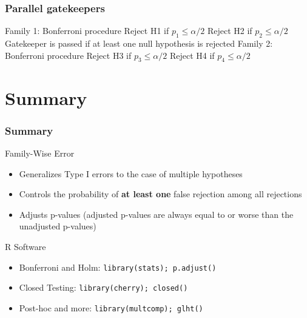 \documentclass[xcolor={pdftex,dvipsnames,table}]{beamer}
\newcommand{\bb}[1]{\begin{block}{#1}}
\newcommand{\eb}{\end{block}}
\newcommand{\bi}{\begin {itemize}}
\newcommand{\ei}{\end{itemize}}
\newcommand{\bfr}[1]{\begin{frame} \frametitle{#1}}
\begin{document}
\begin{frame}
\frametitle{Parallel gatekeepers}
Family 1: Bonferroni procedure
Reject H1 if $p_1 \le \alpha/2$
Reject H2 if $p_2 \le \alpha/2$
Gatekeeper is passed if at least one null
hypothesis is rejected
Family 2: Bonferroni procedure
Reject H3 if $p_3 \le \alpha/2$
Reject H4 if $p_4 \le \alpha/2$

\end{frame}



\section{Summary}
\bfr{Summary}
\bb{Family-Wise Error}
\bi
\item Generalizes Type I errors to the case of multiple hypotheses
\pause
\item Controls the probability of \textbf{at least one} false rejection among all rejections
\pause
\item Adjusts p-values (adjusted p-values are always equal to or worse than the unadjusted p-values)
\ei
\eb
\pause
\bb{R Software}
\bi
\item Bonferroni and Holm: {\tt library(stats); p.adjust()}
\item Closed Testing: {\tt library(cherry); closed()}
\item Post-hoc and more: {\tt library(multcomp); glht()}
\ei
\eb
\end{frame}
\end{document}

